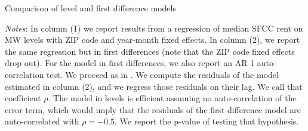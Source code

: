 \clearpage
\begin{table}[h!] \centering
	\caption{Comparison of level and first difference models}
	\label{tab:level_auto}
	
	\begin{minipage}{0.95\textwidth} \footnotesize
		\vspace{3mm} 
		\textit{Notes}: In column (1) we report results from a regression of median SFCC rent on 
		MW levels with ZIP code and year-month fixed effects. In column (2), we report the same 
		regression but in first differences (note that the ZIP code  fixed effects drop out). For 
		the model in first differences, we also report an AR 1 auto-correlation test. We proceed 
		as in \parencite[][section 10.6.3]{wooldridge2010}. We compute the residuals of the model 
		estimated in column (2), and we regress those residuals on their lag. We call that 
		coefficient $\rho$. The model in levels is efficient assuming no auto-correlation of the 
		error term, which would imply that the residuals of the first difference model are 
		auto-correlated with $\rho = -0.5$. We report the p-value of testing that hypothesis.
	\end{minipage} 
\end{table}

